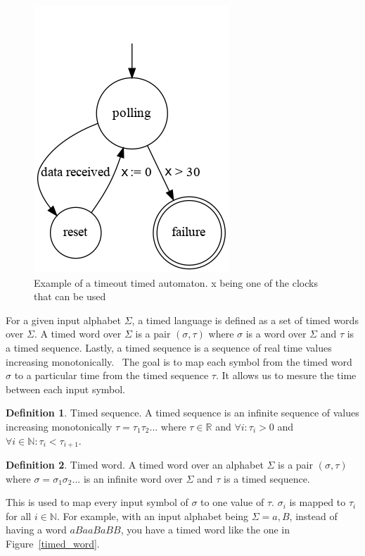\documentclass[12pt]{article}
\theoremstyle{definition}
\newtheorem{definition}{Definition}[section]
\theoremstyle{definition}
\theoremstyle{remark}
\newcommand{\R}{\mathbb{R}}
\begin{document}
\begin{figure}[H]
    \centering
    \includegraphics[scale=2.5]{timed_automata.png}
    \caption{Example of a timeout timed automaton. x being one of the clocks that can be used}
    \label{timed_automata_e1}
\end{figure}

For a given input alphabet $\Sigma$, a timed language is defined as a set of timed words over $\Sigma$. A timed word over $\Sigma$ is a pair $(\sigma, \tau)$ where $\sigma$ is a word over $\Sigma$ and $\tau$ is a timed sequence. Lastly, a timed sequence is a sequence of real time values increasing monotonically.~\cite{ALUR1994183} The goal is to map each symbol from the timed word $\sigma$ to a particular time from the timed sequence $\tau$. It allows us to mesure the time between each input symbol.

\theoremstyle{definition}
\begin{definition}{Timed sequence.}
A timed sequence is an infinite sequence of values increasing monotonically $\tau = \tau_1 \tau_2 ...$ where $\tau \in \R$ and $\forall i : \tau_i > 0$ and $\forall i \in \mathbb{N}: \tau_i < \tau_{i+1}$.
\end{definition}

\theoremstyle{definition}
\begin{definition}{Timed word.}
A timed word over an alphabet $\Sigma$ is a pair $(\sigma, \tau)$ where $\sigma = \sigma_1 \sigma_2 ...$ is an infinite word over $\Sigma$ and $\tau$ is a timed sequence.
\end{definition}

This is used to map every input symbol of $\sigma$ to one value of $\tau$. $\sigma_i$ is mapped to $\tau_i$ for all $i \in \mathbb{N}$. For example, with an input alphabet being $\Sigma = {a, B}$, instead of having a word $aBaaBaBB$, you have a timed word like the one in Figure~\ref{timed_word}.
\end{document}
